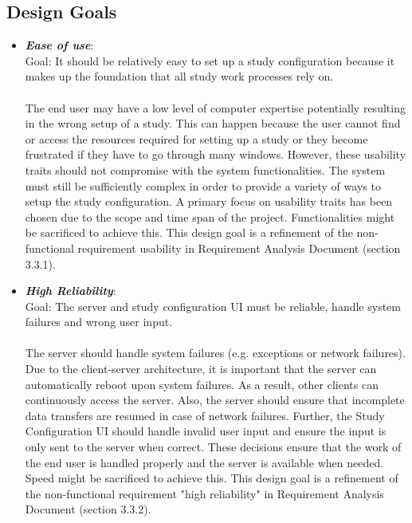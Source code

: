 \subsection{Design Goals}

\begin{itemize}
	\item \textit{\bf{Ease of use}}: 
	\\
	Goal: It should be relatively easy to set up a study configuration because it makes up the foundation that all study work processes rely on. 
	\\\\
	The end user may have a low level of computer expertise potentially resulting in the wrong setup of a study.  This can happen because the user cannot find or access the resources required for setting up a study or they become frustrated if they have to go through many windows. However, these usability traits should not compromise with the system functionalities. The system must still be sufficiently complex in order to provide a variety of ways to setup the study configuration.  A primary focus on usability traits has been chosen due to the scope and time span of the project. Functionalities might be sacrificed to achieve this. This design goal is a refinement of the non-functional requirement  usability in Requirement Analysis Document  (section 3.3.1). 
	
	\item \textit{\bf{High Reliability}}: 
	\\
	Goal: The server and study configuration UI must be reliable, handle system failures and wrong user input.
	\\\\
	The server should handle system failures (e.g. exceptions or network failures). Due to the client-server architecture, it is important that the server can automatically reboot upon system failures. As a result, other clients can continuously access the server. Also, the server should ensure that incomplete data transfers are resumed in case of network failures. Further, the Study Configuration UI should handle invalid user input and ensure the input is only sent to the server when correct. These decisions ensure that the work of the end user is handled properly and the server is available when needed. Speed might be sacrificed to achieve this. This design goal is a refinement of the non-functional requirement "high reliability" in Requirement Analysis Document (section 3.3.2).  
	

\end{itemize}
